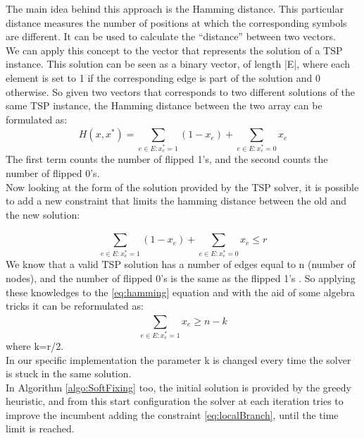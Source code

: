 The main idea behind this approach is the Hamming distance. This particular distance measures the number of positions at which the corresponding symbols are different. It can be used to calculate the “distance” between two vectors. \\
We can apply this concept to the vector that represents the solution of a TSP instance. This solution can be seen as a binary vector, of length |E|, where each element is set to 1 if the corresponding edge is part of the solution and 0 otherwise. So given two vectors that corresponds to two different solutions of the same TSP instance, the Hamming distance between the two array can be formulated as:
\begin{equation}
   H(x,x^*)= \sum_{e\in E: x_e^*=1}^{}(1-x_e) + \sum_{e\in E: x_e^*=0}^{}x_e
\end{equation}
The first term counts the number of flipped 1’s, and the second counts the number of flipped 0’s. \\
Now looking at the form of the solution provided by the TSP solver, it is possible to add a new constraint that limits the hamming distance between the old and the new solution:

\begin{equation}\label{eq:hamming}
    \sum_{e\in E: x_e^*=1}^{}(1-x_e) + \sum_{e\in E: x_e^*=0}^{}x_e \leq r
\end{equation}
We know that a valid TSP solution has a number of edges equal to n (number of nodes), and the number of flipped 0’s is the same as the flipped 1’s . So applying these knowledges to the \ref{eq:hamming} equation and with the aid of some algebra tricks it can be reformulated as:
\begin{equation}\label{eq:localBranch}
    \sum_{e\in E: x_e^*=1}^{}x_e \geq n-k
\end{equation}
where k=r/2.
\\
In our specific implementation the parameter k is changed every time the solver is stuck in the same solution. \\
In Algorithm \ref{algo:SoftFixing} too, the initial solution is provided by the greedy heuristic, and from this start configuration the solver at each iteration tries to improve the incumbent adding the constraint \ref{eq:localBranch}, until the time limit is reached.




